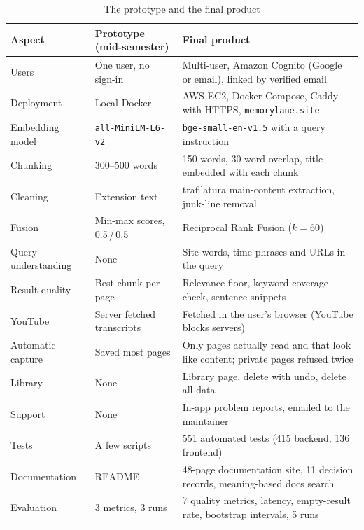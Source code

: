 \begin{table}[!htbp]
\centering
\small
\begin{tabularx}{\textwidth}{>{\raggedright\arraybackslash}p{} L L}
\toprule
\textbf{Aspect} & \textbf{Prototype (mid-semester)} & \textbf{Final product} \\
\midrule
Users & One user, no sign-in & Multi-user, Amazon Cognito (Google or email), linked by verified email \\
Deployment & Local Docker & AWS EC2, Docker Compose, Caddy with HTTPS, \texttt{memorylane.site} \\
Embedding model & \texttt{all-MiniLM-L6-v2} & \texttt{bge-small-en-v1.5} with a query instruction \\
Chunking & 300--500 words & 150 words, 30-word overlap, title embedded with each chunk \\
Cleaning & Extension text & trafilatura main-content extraction, junk-line removal \\
Fusion & Min-max scores, 0.5\,/\,0.5 & Reciprocal Rank Fusion ($k=60$) \\
Query understanding & None & Site words, time phrases and URLs in the query \\
Result quality & Best chunk per page & Relevance floor, keyword-coverage check, sentence snippets \\
YouTube & Server fetched transcripts & Fetched in the user's browser (YouTube blocks servers) \\
Automatic capture & Saved most pages & Only pages actually read and that look like content; private pages refused twice \\
Library & None & Library page, delete with undo, delete all data \\
Support & None & In-app problem reports, emailed to the maintainer \\
Tests & A few scripts & 551 automated tests (415 backend, 136 frontend) \\
Documentation & README & 48-page documentation site, 11 decision records, meaning-based docs search \\
Evaluation & 3 metrics, 3 runs & 7 quality metrics, latency, empty-result rate, bootstrap intervals, 5 runs \\
\bottomrule
\end{tabularx}
\caption{The prototype and the final product}
\label{tab:prototype-vs-final}
\end{table}
